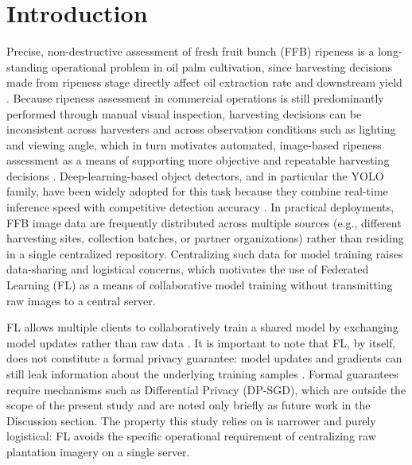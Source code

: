 \documentclass[11pt]{article}
\begin{document}
\section{Introduction}

Precise, non-destructive assessment of fresh fruit bunch (FFB) ripeness is a long-standing operational problem in oil palm cultivation, since harvesting decisions made from ripeness stage directly affect oil extraction rate and downstream yield \cite{suharjito2021,goh2025}. Because ripeness assessment in commercial operations is still predominantly performed through manual visual inspection, harvesting decisions can be inconsistent across harvesters and across observation conditions such as lighting and viewing angle, which in turn motivates automated, image-based ripeness assessment as a means of supporting more objective and repeatable harvesting decisions \cite{suharjito2021,goh2025}. Deep-learning-based object detectors, and in particular the YOLO family, have been widely adopted for this task because they combine real-time inference speed with competitive detection accuracy \cite{redmon2016,jocher2024}. In practical deployments, FFB image data are frequently distributed across multiple sources (e.g., different harvesting sites, collection batches, or partner organizations) rather than residing in a single centralized repository. Centralizing such data for model training raises data-sharing and logistical concerns, which motivates the use of Federated Learning (FL) \cite{mcmahan2017fedavg,konecny2016} as a means of collaborative model training without transmitting raw images to a central server.

FL allows multiple clients to collaboratively train a shared model by exchanging model updates rather than raw data \cite{mcmahan2017fedavg}. It is important to note that FL, by itself, does not constitute a formal privacy guarantee: model updates and gradients can still leak information about the underlying training samples \cite{zhu2019,zhao2020}. Formal guarantees require mechanisms such as Differential Privacy (DP-SGD), which are outside the scope of the present study and are noted only briefly as future work in the Discussion section. The property this study relies on is narrower and purely logistical: FL avoids the specific operational requirement of centralizing raw plantation imagery on a single server.
\end{document}
